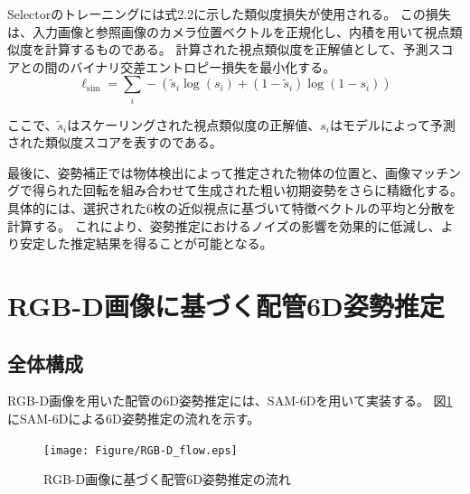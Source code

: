Selectorのトレーニングには式2.2に示した類似度損失が使用される。
この損失は、入力画像と参照画像のカメラ位置ベクトルを正規化し、内積を用いて視点類似度を計算するものである。
計算された視点類似度を正解値として、予測スコアとの間のバイナリ交差エントロピー損失を最小化する。
\begin{equation}
	\ell_{\text{sim}} = \sum_{i} - \left( \tilde{s}_i \log(s_i) + (1 - \tilde{s}_i) \log(1 - s_i) \right)
	\tag{2.2}
\end{equation}
	
ここで、\(\tilde{s}_i\)はスケーリングされた視点類似度の正解値、\(s_i\)はモデルによって予測された類似度スコアを表すのである。

最後に、姿勢補正では物体検出によって推定された物体の位置と、画像マッチングで得られた回転を組み合わせて生成された粗い初期姿勢をさらに精緻化する。
具体的には、選択された6枚の近似視点に基づいて特徴ベクトルの平均と分散を計算する。
これにより、姿勢推定におけるノイズの影響を効果的に低減し、より安定した推定結果を得ることが可能となる。


\section{RGB-D画像に基づく配管6D姿勢推定}
\subsection{全体構成}
RGB-D画像を用いた配管の6D姿勢推定には、SAM-6Dを用いて実装する。
図\ref{fig:f6}にSAM-6Dによる6D姿勢推定の流れを示す。
\begin{figure}[htbt]
	\centering
	 \texttt{[image: Figure/RGB-D\_flow.eps]}
	 \caption{RGB-D画像に基づく配管6D姿勢推定の流れ}
	 \label{fig:f6}
\end{figure}



